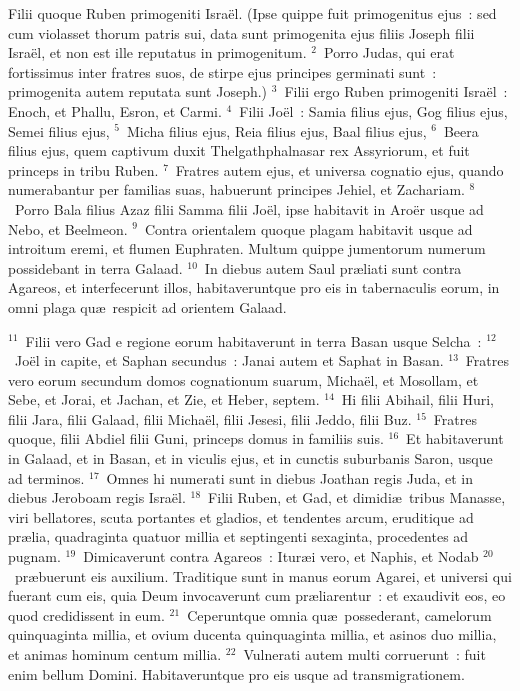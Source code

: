 \bchapter
\lettrine[lines=3,image=true,loversize=0.05,lraise=-0.03]{F}{}ilii quoque Ruben primogeniti Isra\"el. (Ipse quippe fuit primogenitus ejus~: sed cum violasset thorum patris sui, data sunt primogenita ejus filiis Joseph filii Isra\"el, et non est ille reputatus in primogenitum.
${}^{2}$~Porro Judas, qui erat fortissimus inter fratres suos, de stirpe ejus principes germinati sunt~: primogenita autem reputata sunt Joseph.)
${}^{3}$~Filii ergo Ruben primogeniti Isra\"el~: Enoch, et Phallu, Esron, et Carmi.
${}^{4}$~Filii Jo\"el~: Samia filius ejus, Gog filius ejus, Semei filius ejus,
${}^{5}$~Micha filius ejus, Reia filius ejus, Baal filius ejus,
${}^{6}$~Beera filius ejus, quem captivum duxit Thelgathphalnasar rex Assyriorum, et fuit princeps in tribu Ruben.
${}^{7}$~Fratres autem ejus, et universa cognatio ejus, quando numerabantur per familias suas, habuerunt principes Jehiel, et Zachariam.
${}^{8}$~Porro Bala filius Azaz filii Samma filii Jo\"el, ipse habitavit in Aro\"er usque ad Nebo, et Beelmeon.
${}^{9}$~Contra orientalem quoque plagam habitavit usque ad introitum eremi, et flumen Euphraten. Multum quippe jumentorum numerum possidebant in terra Galaad.
${}^{10}$~In diebus autem Saul pr\ae liati sunt contra Agareos, et interfecerunt illos, habitaveruntque pro eis in tabernaculis eorum, in omni plaga qu\ae\ respicit ad orientem Galaad.


${}^{11}$~Filii vero Gad e regione eorum habitaverunt in terra Basan usque Selcha~:
${}^{12}$~Jo\"el in capite, et Saphan secundus~: Janai autem et Saphat in Basan.
${}^{13}$~Fratres vero eorum secundum domos cognationum suarum, Micha\"el, et Mosollam, et Sebe, et Jorai, et Jachan, et Zie, et Heber, septem.
${}^{14}$~Hi filii Abihail, filii Huri, filii Jara, filii Galaad, filii Micha\"el, filii Jesesi, filii Jeddo, filii Buz.
${}^{15}$~Fratres quoque, filii Abdiel filii Guni, princeps domus in familiis suis.
${}^{16}$~Et habitaverunt in Galaad, et in Basan, et in viculis ejus, et in cunctis suburbanis Saron, usque ad terminos.
${}^{17}$~Omnes hi numerati sunt in diebus Joathan regis Juda, et in diebus Jeroboam regis Isra\"el.
${}^{18}$~Filii Ruben, et Gad, et dimidi\ae\ tribus Manasse, viri bellatores, scuta portantes et gladios, et tendentes arcum, eruditique ad pr\ae lia, quadraginta quatuor millia et septingenti sexaginta, procedentes ad pugnam.
${}^{19}$~Dimicaverunt contra Agareos~: Itur\ae i vero, et Naphis, et Nodab
${}^{20}$~pr\ae buerunt eis auxilium. Traditique sunt in manus eorum Agarei, et universi qui fuerant cum eis, quia Deum invocaverunt cum pr\ae liarentur~: et exaudivit eos, eo quod credidissent in eum.
${}^{21}$~Ceperuntque omnia qu\ae\ possederant, camelorum quinquaginta millia, et ovium ducenta quinquaginta millia, et asinos duo millia, et animas hominum centum millia.
${}^{22}$~Vulnerati autem multi corruerunt~: fuit enim bellum Domini. Habitaveruntque pro eis usque ad transmigrationem.


